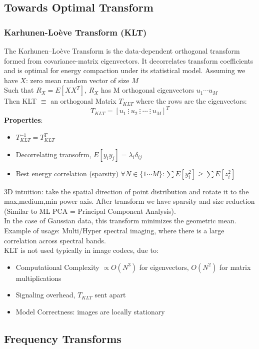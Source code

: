 \subsection{Towards Optimal Transform}
\subsubsection{Karhunen-Lo\`eve Transform (KLT)}
The Karhunen--Lo\`eve Transform is the data-dependent orthogonal transform formed from covariance-matrix eigenvectors. It decorrelates transform coefficients and is optimal for energy compaction under its statistical model.
Assuming we have $X$: zero mean random vector of size $M$\\
Such that $R_X = E[XX^T]$, $R_X$ has M orthogonal eigenvectors $u_1 \cdots u_M$\\
Then KLT $\equiv$ an orthogonal Matrix $T_{KLT}$ where the rows are the eigenvectors:
$$T_{KLT} = \left[u_1 \ \vdots\ u_2\ \vdots\ \cdots\ \vdots\ u_M\right]^T$$
\textbf{Properties}:
\begin{itemize}
    \item $T_{KLT}^{-1} = T_{KLT}^T$
    \item Decorrelating transofrm, $E[y_iy_j] =\lambda_i \delta_{ij}$
    \item Best energy correlation (sparsity) $\forall N \in \{1 \cdots M\} : \sum E[y_i^2] \geq \sum E[z_i^2]$
\end{itemize}
3D intuition: take the spatial direction of point distribution and rotate it to the max,medium,min power axis. After transform we have sparsity and size reduction (Similar to ML PCA = Principal Component Analysis).\\
In the case of Gaussian data, this transform minimizes the geometric mean.\\
Example of usage: Multi/Hyper spectral imaging, where there is a large correlation across spectral bands.\\
KLT is not used typically in image codecs, due to:
\begin{itemize}
    \item Computational Complexity $\propto O(N^3)$ for eigenvectors, $O(N^2)$ for matrix multiplications
    \item Signaling overhead, $T_{KLT}$ sent apart
    \item Model Correctness: images are locally stationary
\end{itemize}
\subsection{Frequency Transforms}
